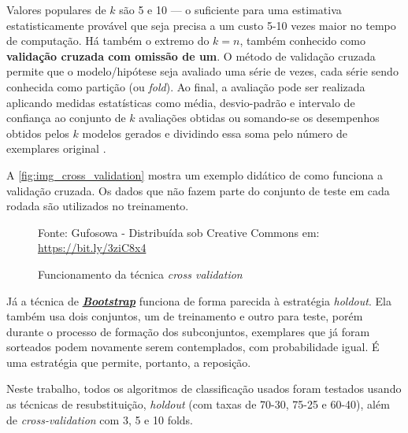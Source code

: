 Valores populares de $k$ são 5 e 10 --- o suficiente para uma estimativa estatisticamente provável que seja precisa a um custo 5-10 vezes maior no tempo de computação. Há também o extremo do $k = n$, também conhecido como \textbf{validação cruzada com omissão de um}. O método de validação cruzada permite que o modelo/hipótese seja avaliado uma série de vezes, cada série sendo conhecida como partição (ou \textit{fold}). Ao final, a avaliação pode ser realizada aplicando medidas estatísticas como média, desvio-padrão e intervalo de confiança ao conjunto de $k$ avaliações obtidas ou somando-se os desempenhos obtidos pelos $k$ modelos gerados e dividindo essa soma pelo número de exemplares original \cite{Norvig2013, Boscarioli2017, ferrari2017, aprenda_mineracao_fernando_amaral16}.

A \autoref{fig:img_cross_validation} mostra um exemplo didático de como funciona a validação cruzada. Os dados que não fazem parte do conjunto de teste em cada rodada são utilizados no treinamento.

\begin{figure}[h!]
	\centering
	\caption{Funcionamento da técnica \textit{cross validation}}
	
	{\scriptsize Fonte: Gufosowa - Distribuída sob Creative Commons em: \href{https://bit.ly/3ziC8x4}{https://bit.ly/3ziC8x4} %
	}
	\label{fig:img_cross_validation}
\end{figure}

Já a técnica de \textit{\textbf{\underline{Bootstrap}}} funciona de forma  parecida à estratégia \textit{holdout}. Ela também usa dois conjuntos, um de treinamento e outro para teste, porém durante o processo de formação dos subconjuntos, exemplares que já foram sorteados podem novamente serem contemplados, com probabilidade igual. É uma estratégia que permite, portanto, a reposição.

Neste trabalho, todos os algoritmos de classificação usados foram testados usando as técnicas de resubstituição, \textit{holdout} (com taxas de 70-30, 75-25 e 60-40), além de \textit{cross-validation} com 3, 5 e 10 folds. 


